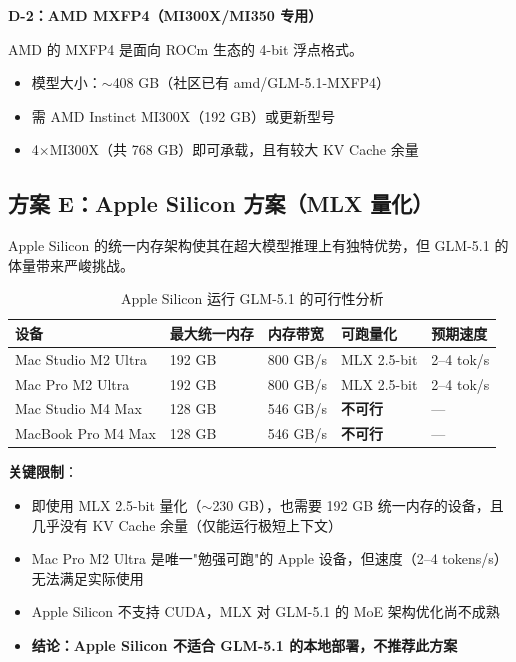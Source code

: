 \documentclass[UTF8,a4paper,10pt,oneside]{ctexart}
\begin{document}
\textbf{D-2：AMD MXFP4（MI300X/MI350 专用）}

AMD 的 MXFP4 是面向 ROCm 生态的 4-bit 浮点格式。
\begin{itemize}
    \item 模型大小：$\sim$408 GB（社区已有 amd/GLM-5.1-MXFP4）
    \item 需 AMD Instinct MI300X（192 GB）或更新型号
    \item 4$\times$MI300X（共 768 GB）即可承载，且有较大 KV Cache 余量
\end{itemize}

\subsection{方案 E：Apple Silicon 方案（MLX 量化）}

Apple Silicon 的统一内存架构使其在超大模型推理上有独特优势，但 GLM-5.1 的体量带来严峻挑战。

\begin{table}[htbp]
\centering
\caption{Apple Silicon 运行 GLM-5.1 的可行性分析}
\begin{tabular}{p{3cm}p{2cm}p{2.2cm}p{2.5cm}p{2cm}}
\hline
\textbf{设备} & \textbf{最大统一内存} & \textbf{内存带宽} & \textbf{可跑量化} & \textbf{预期速度} \\
\hline
Mac Studio M2 Ultra & 192 GB & 800 GB/s & MLX 2.5-bit & 2--4 tok/s \\
Mac Pro M2 Ultra & 192 GB & 800 GB/s & MLX 2.5-bit & 2--4 tok/s \\
Mac Studio M4 Max & 128 GB & 546 GB/s & \textbf{不可行} & --- \\
MacBook Pro M4 Max & 128 GB & 546 GB/s & \textbf{不可行} & --- \\
\hline
\end{tabular}
\end{table}

\textbf{关键限制}：
\begin{itemize}
    \item 即使用 MLX 2.5-bit 量化（$\sim$230 GB），也需要 192 GB 统一内存的设备，且几乎没有 KV Cache 余量（仅能运行极短上下文）
    \item Mac Pro M2 Ultra 是唯一"勉强可跑"的 Apple 设备，但速度（2--4 tokens/s）无法满足实际使用
    \item Apple Silicon 不支持 CUDA，MLX 对 GLM-5.1 的 MoE 架构优化尚不成熟
    \item \textbf{结论：Apple Silicon 不适合 GLM-5.1 的本地部署，不推荐此方案}
\end{itemize}
\end{document}

